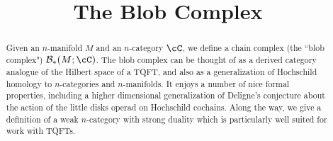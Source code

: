 \documentclass[11pt,leqno]{article}
\title{The Blob Complex}
\begin{document}
\makeatletter
{}
\gdef\theequation{\thesection.\arabic{equation}}
\makeatother

\maketitle

%

\begin{abstract}
Given an $n$-manifold $M$ and an $n$-category $\cC$, we define a chain complex
(the ``blob complex") $\bc_*(M; \cC)$.
The blob complex can be thought of as a derived category analogue of the Hilbert space of a TQFT, 
and also as a generalization of Hochschild homology to $n$-categories and $n$-manifolds.
It enjoys a number of nice formal properties, including a higher dimensional
generalization of Deligne's conjecture about the action of the little disks operad on Hochschild cochains.
Along the way, we give a definition of a weak $n$-category with strong duality which
is particularly well suited for work with TQFTs.
\end{abstract}


\tableofcontents

















\end{document}
